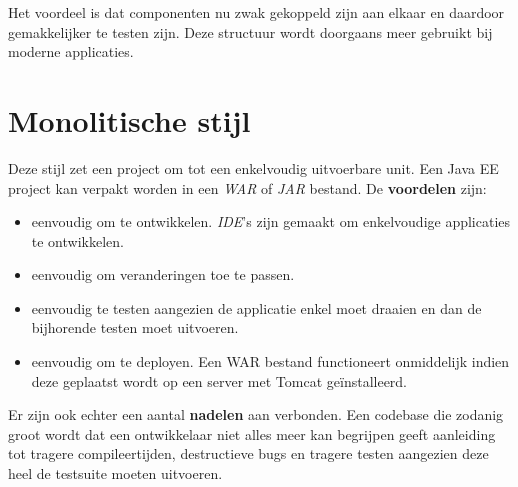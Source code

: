 \documentclass{report}
\begin{document}
	Het voordeel is dat componenten nu zwak gekoppeld zijn aan elkaar en daardoor gemakkelijker te testen zijn. Deze structuur wordt doorgaans meer gebruikt bij moderne applicaties.
	
	\section{Monolitische stijl}
	Deze stijl zet een project om tot een enkelvoudig uitvoerbare unit. Een Java EE project kan verpakt worden in een \textit{WAR} of \textit{JAR} bestand. De \textbf{voordelen} zijn:
	\begin{itemize}
		\item eenvoudig om te ontwikkelen. \textit{IDE}'s zijn gemaakt om enkelvoudige applicaties te ontwikkelen.
		\item eenvoudig om veranderingen toe te passen. 
		\item eenvoudig te testen aangezien de applicatie enkel moet draaien en dan de bijhorende testen moet uitvoeren.
		\item eenvoudig om te deployen. Een WAR bestand functioneert onmiddelijk indien deze geplaatst wordt op een server met Tomcat geïnstalleerd.
	\end{itemize}
	Er zijn ook echter een aantal \textbf{nadelen} aan verbonden. Een codebase die zodanig groot wordt dat een ontwikkelaar niet alles meer kan begrijpen geeft aanleiding tot tragere compileertijden, destructieve bugs en tragere testen aangezien deze heel de testsuite moeten uitvoeren.
	
\end{document}
